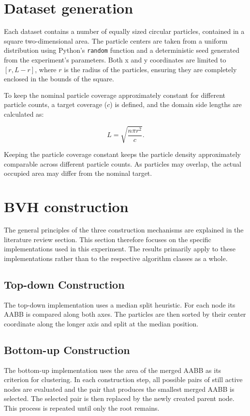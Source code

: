 \section{Dataset generation}
Each dataset contains a number of equally sized circular particles, contained in a square two-dimensional area.
The particle centers are taken from a uniform distribution using Python's \texttt{random} function and a deterministic seed generated from the experiment's parameters.
Both x and y coordinates are limited to $[r,L-r]$, where $r$ is the radius of the particles, ensuring they are completely enclosed in the bounds of the square.

To keep the nominal particle coverage approximately constant for different particle counts, a target coverage ($c$) is defined, and the domain side lengths are calculated as:

\[
L=\sqrt{\frac{n\pi r^2}{c}}.
\]

Keeping the particle coverage constant keeps the particle density approximately comparable across different particle counts.
As particles may overlap, the actual occupied area may differ from the nominal target.


\section{BVH construction}
The general principles of the three construction mechanisms are explained in the literature review section.
This section therefore focuses on the specific implementations used in this experiment.
The results primarily apply to these implementations rather than to the respective algorithm classes as a whole.

\subsection{Top-down Construction}

The top-down implementation uses a median split heuristic. 
For each node its AABB is compared along both axes. 
The particles are then sorted by their center coordinate along the longer axis and split at the median position.

\subsection{Bottom-up Construction}

The bottom-up implementation uses the area of the merged AABB as its criterion for clustering. 
In each construction step, all possible pairs of still active nodes are evaluated and the pair that produces the smallest merged AABB is selected.
The selected pair is then replaced by the newly created parent node. This process is repeated until only the root remains.

